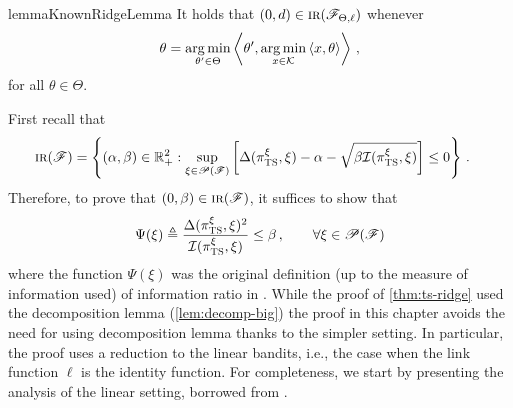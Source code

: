 \documentclass[letter, 12pt]{report}
\newcommand{\R}{\mathbb R}
\newcommand{\argmin}{\operatornamewithlimits{arg\,min}}
\newcommand{\explan}[1]{\stackrel{\text{\tiny \texttt{#1}}}}
\newcommand{\ip}[1]{\left \langle #1 \right \rangle}
\newcommand{\cK}{\mathcal K}
\newcommand{\sF}{\mathscr F}
\newcommand{\sP}{\mathscr P}
\newcommand{\I}{\mathcal{I}}
\newcommand{\1}{\mathbf{1}}
\newcommand{\IR}{\operatorname{\textsc{ir}}}
\newcommand{\ts}{\textsc{TS}\xspace}
\theoremstyle{plain}
\theoremstyle{definition}
\theoremstyle{remark}
\begin{document}
\begin{restatable}{lemma}{KnownRidgeLemma}
    \label{thm:ridge-known-ir}
    It holds that $(0, d) \in \IR(\sF_{\Theta,\ell})$ whenever
    \begin{align*}
        \theta = \argmin_{\theta' \in \Theta} \ip{\theta', \argmin_{x \in \cK} \ip{x, \theta}}\,,
    \end{align*}
    for all $\theta \in \Theta$.
\end{restatable}
First recall that
\begin{align}
    \IR(\sF)
     & = \left\{(\alpha, \beta) \in \R_+^2 : \sup_{\xi \in \sP(\sF)} \left[\Delta(\pi^\xi_\ts, \xi) - \alpha - \sqrt{\beta \I(\pi^\xi_\ts, \xi)}\right] \leq 0 \right\}\,. \nonumber
\end{align}
Therefore, to prove that $(0, \beta) \in \IR(\sF)$, it suffices to show that
\begin{align}
    \Psi(\xi) \triangleq
    \frac{\Delta(\pi^\xi_\ts, \xi)^2}{\I(\pi^\xi_\ts, \xi)} \leq \beta\,,\qquad \forall \xi \in \sP(\sF)
    \label{eq:IR-alpha-0}
\end{align}
where the function $\Psi(\xi)$ was the original definition (up to the measure of information used) of information ratio in \citet{RV16}.
While the proof of \cref{thm:ts-ridge} used the decomposition lemma (\cref{lem:decomp-big}) the proof in this chapter avoids the need for using decomposition lemma thanks to the simpler setting.
In particular, the proof uses a reduction to the linear bandits, i.e., the case when the link function $\ell$ is the identity function.
For completeness, we start by presenting the analysis of the linear setting, borrowed from \cite{RV16}.
\end{document}
